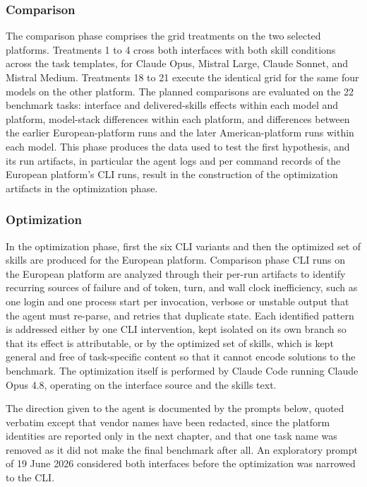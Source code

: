 \documentclass[
english,                 %
bibtex,                  %
]{kththesis}
\numberwithin{listing}{chapter}
\begin{document}
\subsubsection{Comparison}
\label{sec:method_comparison}

The comparison phase comprises the grid treatments on the two selected platforms. Treatments 1 to 4 cross both interfaces with both skill conditions across the task templates, for Claude Opus, Mistral Large, Claude Sonnet, and Mistral Medium. Treatments 18 to 21 execute the identical grid for the same four models on the other platform. The planned comparisons are evaluated on the 22 benchmark tasks: interface and delivered-skills effects within each model and platform, model-stack differences within each platform, and differences between the earlier European-platform runs and the later American-platform runs within each model. This phase produces the data used to test the first hypothesis, and its run artifacts, in particular the agent logs and per command records of the European platform's \gls{CLI} runs, result in the construction of the optimization artifacts in the optimization phase.

\subsubsection{Optimization}
\label{sec:method_optimization}

In the optimization phase, first the six \gls{CLI} variants and then the optimized set of skills are produced for the European platform. Comparison phase \gls{CLI} runs on the European platform are analyzed through their per-run artifacts to identify recurring sources of failure and of token, turn, and wall clock inefficiency, such as one login and one process start per invocation, verbose or unstable output that the agent must re-parse, and retries that duplicate state. Each identified pattern is addressed either by one \gls{CLI} intervention, kept isolated on its own branch so that its effect is attributable, or by the optimized set of skills, which is kept general and free of task-specific content so that it cannot encode solutions to the benchmark. The optimization itself is performed by Claude Code running Claude Opus 4.8, operating on the interface source and the skills text.

The direction given to the agent is documented by the prompts below, quoted verbatim except that vendor names have been redacted, since the platform identities are reported only in the next chapter, and that one task name was removed as it did not make the final benchmark after all. An exploratory prompt of 19 June 2026 considered both interfaces before the optimization was narrowed to the \gls{CLI}.
\end{document}
